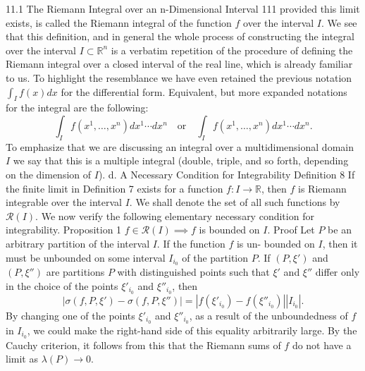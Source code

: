 11.1 The Riemann Integral over an n-Dimensional Interval
111
provided this limit exists, is called the Riemann integral of the function $f$ over the
interval $I$.
We see that this definition, and in general the whole process of constructing the
integral over the interval $I \subset \mathbb{R}^n$ is a verbatim repetition of the procedure of defining
the Riemann integral over a closed interval of the real line, which is already familiar
to us. To highlight the resemblance we have even retained the previous notation
$\int_I f(x)dx$ for the differential form. Equivalent, but more expanded notations for the
integral are the following:
$$
\int_I f(x^1,\ldots,x^n) dx^1\cdots dx^n \quad \text{or} \quad \int_I f(x^1,\ldots,x^n) dx^1\cdots dx^n.
$$
To emphasize that we are discussing an integral over a multidimensional domain
$I$ we say that this is a multiple integral (double, triple, and so forth, depending on
the dimension of $I$).
d. A Necessary Condition for Integrability
Definition 8 If the finite limit in Definition 7 exists for a function $f : I \to \mathbb{R}$, then
$f$ is Riemann integrable over the interval $I$.
We shall denote the set of all such functions by $\mathcal{R}(I)$.
We now verify the following elementary necessary condition for integrability.
Proposition 1 $f \in \mathcal{R}(I) \implies f$ is bounded on $I$.
Proof Let $P$ be an arbitrary partition of the interval $I$. If the function $f$ is un-
bounded on $I$, then it must be unbounded on some interval $I_{i_0}$ of the partition $P$.
If $(P, \xi')$ and $(P, \xi'')$ are partitions $P$ with distinguished points such that $\xi'$ and $\xi''$
differ only in the choice of the points $\xi'_{i_0}$ and $\xi''_{i_0}$, then
$$
|\sigma(f, P, \xi') - \sigma(f, P, \xi'')| = |f(\xi'_{i_0}) - f(\xi''_{i_0})| |I_{i_0}|.
$$
By changing one of the points $\xi'_{i_0}$ and $\xi''_{i_0}$, as a result of the unboundedness of $f$
in $I_{i_0}$, we could make the right-hand side of this equality arbitrarily large. By the
Cauchy criterion, it follows from this that the Riemann sums of $f$ do not have a
limit as $\lambda(P) \to 0$.